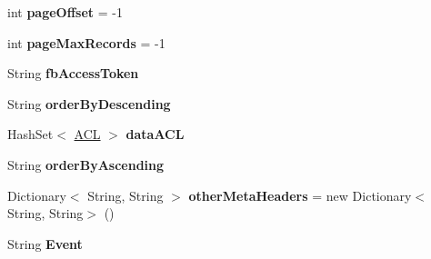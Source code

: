 \begin{DoxyCompactItemize}
\item 
\hypertarget{classcom_1_1shephertz_1_1app42_1_1paas_1_1sdk_1_1csharp_1_1_app42_service_a36034bbafcae8fe739520daed7773a51}{int {\bfseries page\+Offset} = -\/1}\label{classcom_1_1shephertz_1_1app42_1_1paas_1_1sdk_1_1csharp_1_1_app42_service_a36034bbafcae8fe739520daed7773a51}

\item 
\hypertarget{classcom_1_1shephertz_1_1app42_1_1paas_1_1sdk_1_1csharp_1_1_app42_service_aeaea4adf96f9c84af7a75056c31cf969}{int {\bfseries page\+Max\+Records} = -\/1}\label{classcom_1_1shephertz_1_1app42_1_1paas_1_1sdk_1_1csharp_1_1_app42_service_aeaea4adf96f9c84af7a75056c31cf969}

\item 
\hypertarget{classcom_1_1shephertz_1_1app42_1_1paas_1_1sdk_1_1csharp_1_1_app42_service_a19e2edda16ad258d7cddd92bb025bd49}{String {\bfseries fb\+Access\+Token}}\label{classcom_1_1shephertz_1_1app42_1_1paas_1_1sdk_1_1csharp_1_1_app42_service_a19e2edda16ad258d7cddd92bb025bd49}

\item 
\hypertarget{classcom_1_1shephertz_1_1app42_1_1paas_1_1sdk_1_1csharp_1_1_app42_service_ad7b588c3f5b58ff03e5ddae835352d21}{String {\bfseries order\+By\+Descending}}\label{classcom_1_1shephertz_1_1app42_1_1paas_1_1sdk_1_1csharp_1_1_app42_service_ad7b588c3f5b58ff03e5ddae835352d21}

\item 
\hypertarget{classcom_1_1shephertz_1_1app42_1_1paas_1_1sdk_1_1csharp_1_1_app42_service_a7245ccffd750de0dd4da88c3d2765aad}{Hash\+Set$<$ \hyperlink{classcom_1_1shephertz_1_1app42_1_1paas_1_1sdk_1_1csharp_1_1_a_c_l}{A\+C\+L} $>$ {\bfseries data\+A\+C\+L}}\label{classcom_1_1shephertz_1_1app42_1_1paas_1_1sdk_1_1csharp_1_1_app42_service_a7245ccffd750de0dd4da88c3d2765aad}

\item 
\hypertarget{classcom_1_1shephertz_1_1app42_1_1paas_1_1sdk_1_1csharp_1_1_app42_service_a0314a5daa5a5cbcda9f2a4c6dec6c15e}{String {\bfseries order\+By\+Ascending}}\label{classcom_1_1shephertz_1_1app42_1_1paas_1_1sdk_1_1csharp_1_1_app42_service_a0314a5daa5a5cbcda9f2a4c6dec6c15e}

\item 
\hypertarget{classcom_1_1shephertz_1_1app42_1_1paas_1_1sdk_1_1csharp_1_1_app42_service_a3a522a2c4ce13f0ca342a6a5e15ff262}{Dictionary$<$ String, String $>$ {\bfseries other\+Meta\+Headers} = new Dictionary$<$String, String$>$ ()}\label{classcom_1_1shephertz_1_1app42_1_1paas_1_1sdk_1_1csharp_1_1_app42_service_a3a522a2c4ce13f0ca342a6a5e15ff262}

\item 
\hypertarget{classcom_1_1shephertz_1_1app42_1_1paas_1_1sdk_1_1csharp_1_1_app42_service_a2d0c7c17998665378b747584463550ae}{String {\bfseries Event}}\label{classcom_1_1shephertz_1_1app42_1_1paas_1_1sdk_1_1csharp_1_1_app42_service_a2d0c7c17998665378b747584463550ae}

\end{DoxyCompactItemize}
